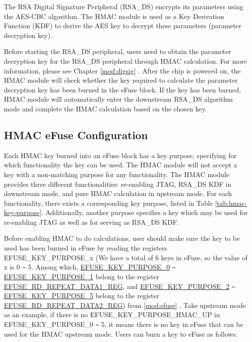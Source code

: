 \documentclass[main\_\_EN.tex]{subfiles}
\begin{document}
The RSA Digital Signature Peripheral (RSA\_DS) encrypts its parameters using the AES-CBC algorithm. The HMAC module is used as a Key Derivation Function (KDF) to derive the AES key to decrypt these parameters (parameter decryption key).

Before starting the RSA\_DS peripheral, users need to obtain the parameter decryption key for the RSA\_DS peripheral through HMAC calculation. For more information, please see Chapter \ref{mod:digsig} \textit{}. After the chip is powered on, the HMAC module will check whether the key required to calculate the parameter decryption key has been burned in the eFuse block. If the key has been burned, HMAC module will automatically enter the downstream RSA\_DS algorithm mode and complete the HMAC calculation based on the chosen key.

\subsection{HMAC eFuse Configuration}
\label{sec:hmac-config-function}

Each HMAC key burned into an eFuse block has a key purpose, specifying for which functionality the key can be used. The HMAC module will not accept a key with a non-matching purpose for any functionality. The HMAC module provides three different functionalities: re-enabling JTAG, RSA\_DS KDF in downstream mode, and pure HMAC calculation in upstream mode. For each functionality, there exists a corresponding key purpose, listed in Table \ref{tab:hmac-key-purpose}. Additionally, another purpose specifies a key which may be used for re-enabling JTAG as well as for serving as RSA\_DS KDF.

Before enabling HMAC to do calculations, user should make sure the key to be used has been burned in eFuse by reading the registers EFUSE\_KEY\_PURPOSE\_x (We have a total of 6 keys in eFuse, so the value of x is 0 \verb+~+ 5. Among which, \hyperref[fielddesc:EFUSEKEYPURPOSE0]{EFUSE\_KEY\_PURPOSE\_0} \verb+~+ \hyperref[fielddesc:EFUSEKEYPURPOSE1]{EFUSE\_KEY\_PURPOSE\_1} belong to the register \hyperref[regdesc:EFUSERDREPEATDATA1REG]{EFUSE\_RD\_REPEAT\_DATA1\_REG}, and \hyperref[fielddesc:EFUSEKEYPURPOSE2]{EFUSE\_KEY\_PURPOSE\_2} \verb+~+ \hyperref[fielddesc:EFUSEKEYPURPOSE5]{EFUSE\_KEY\_PURPOSE\_5} belong to the register \hyperref[regdesc:EFUSERDREPEATDATA2REG]{EFUSE\_RD\_REPEAT\_DATA2\_REG}) from \ref{mod:efuse} \textit{}. Take upstream mode as an example, if there is no EFUSE\_KEY\_PURPOSE\_HMAC\_UP in EFUSE\_KEY\_PURPOSE\_0 \verb+~+ 5, it means there is no key in eFuse that can be used for the HMAC upstream mode. Users can burn a key to eFuse as follows:
\end{document}
